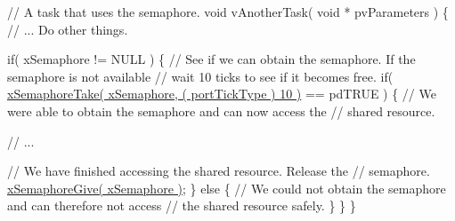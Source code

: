\begin{DoxyPre}// A task that uses the semaphore.
void vAnotherTask( void * pvParameters )
\{
   // ... Do other things.\end{DoxyPre}



\begin{DoxyPre}   if( xSemaphore != NULL )
   \{
       // See if we can obtain the semaphore.  If the semaphore is not available
       // wait 10 ticks to see if it becomes free.  
       if( \hyperlink{semphr_8h_af116e436d2a5ae5bd72dbade2b5ea930}{xSemaphoreTake( xSemaphore, ( portTickType ) 10 )} == pdTRUE )
       \{
           // We were able to obtain the semaphore and can now access the
           // shared resource.\end{DoxyPre}



\begin{DoxyPre}           // ...\end{DoxyPre}



\begin{DoxyPre}           // We have finished accessing the shared resource.  Release the 
           // semaphore.
           \hyperlink{semphr_8h_aae55761cabfa9bf85c8f4430f78c0953}{xSemaphoreGive( xSemaphore )};
       \}
       else
       \{
           // We could not obtain the semaphore and can therefore not access
           // the shared resource safely.
       \}
   \}
\}
\end{DoxyPre}
 